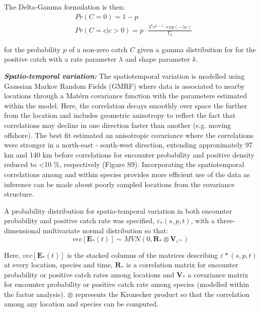 \documentclass{nature}
\begin{document}
\begin{linenumbers}
The Delta-Gamma formulation is then:
\begin{equation}
	\begin{split}
	& Pr(C = 0) = 1 - p \\
	& Pr(C = c | c > 0) = p \cdot \frac{\lambda^{k}c^{k-1} \cdot exp(-\lambda c)}{\Gamma_{k}}
	\end{split}
\end{equation}

for the probability $p$ of a non-zero catch $C$ given a gamma distribution for
for the positive catch with a rate parameter $\lambda$ and shape parameter $k$.

\textbf{\textit{Spatio-temporal variation:}} The spatiotemporal variation is
modelled using Gaussian Markov Random Fields (GMRF) where data is associated to
nearby locations through a Matérn covariance function with the parameters
estimated within the model. Here, the correlation decays smoothly over space
the further from the location and includes geometric anisotropy to reflect the
fact that correlations may decline in one direction faster than another (e.g.
moving offshore)\cite{Thorson2013}.  The best fit estimated an anisotropic
covariance where the correlations were stronger in a north-east - south-west
direction, extending approximately 97 km and 140 km before correlations for
encounter probability and positive density reduced to \textless 10 \%,
respectively (Figure S9).  Incorporating the spatiotemporal correlations among
and within species provides more efficient use of the data as inference
can be made about poorly sampled locations from the covariance structure.

A probability distribution for spatio-temporal variation in both encounter
probability and positive catch rate was specified, $\varepsilon_{*}(s,p,t)$,
with a three-dimensional multivariate normal distribution so that:
	\begin{equation}
		vec[\mathbf{E}_{*}(t)] \sim MVN(0,\mathbf{R}_{*} \otimes
		\mathbf{V}_{{\varepsilon}{*}})
	\end{equation}

Here, $vec[\mathbf{E}_{*}(t)]$ is the stacked columns of the matrices
describing $\varepsilon{*}(s,p,t)$ at every location, species and time,
$\mathbf{R}_{*}$ is a correlation matrix for encounter probability or positive
catch rates among locations and $\mathbf{V}_{*}$ a covariance matrix for
encounter probability or positive catch rate among species (modelled within the
factor analysis). $\otimes$ represents the Kronecker product so that the
correlation among any location and species can be computed\cite{Thorson2017}.
		

\end{linenumbers}
\end{document}
